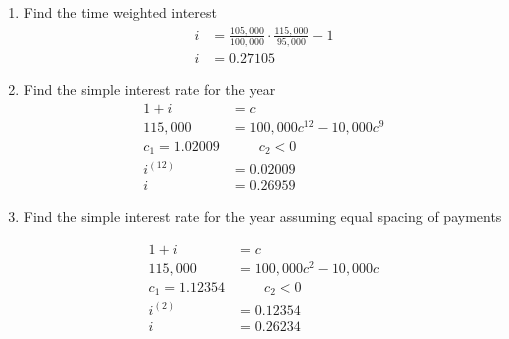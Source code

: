 \documentclass[a4paper, 12pt, reqno]{amsart}
\numberwithin{equation}{section}
\begin{document}
\begin{enumerate}[label=(\alph*)]
    \item Find the time weighted interest
        \begin{equation}\nonumber
            \begin{aligned}
                i &= \frac{105,000}{100,000} \cdot \frac{115,000}{95,000} -1 \\
                i &= 0.27105
            \end{aligned}
        \end{equation}
    \item Find the simple interest rate for the year
        \begin{equation}\nonumber
            \begin{aligned}
                1 + i &= c  \\
                115,000 &= 100,000c^{12} - 10,000c^9    \\
                c_1 = 1.02009 &\qquad c_2 < 0       \\
                i^{(12)} &= 0.02009  \\
                i &= 0.26959
            \end{aligned}
        \end{equation}
    \item Find the simple interest rate for the year assuming equal spacing of
        payments
        \begin{center}
        \end{center}
        \begin{equation}\nonumber
            \begin{aligned}
                1 + i &= c  \\
                115,000 &= 100,000c^{2} - 10,000c    \\
                c_1 = 1.12354 &\qquad c_2 < 0       \\
                i^{(2)} &= 0.12354  \\
                i &= 0.26234
            \end{aligned}
        \end{equation}
\end{enumerate}
\end{document}

